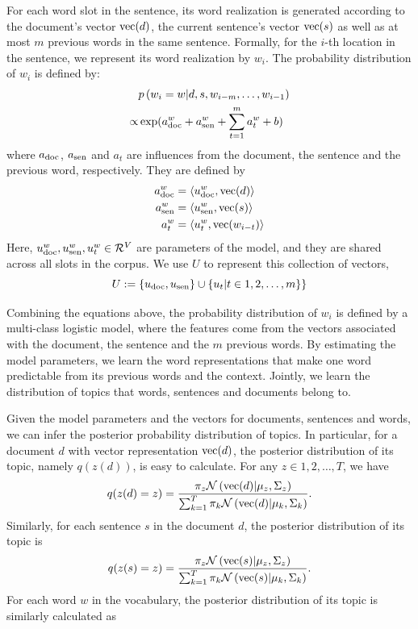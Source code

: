 \documentclass[english,letter]{article}
\renewcommand\[{\begin{equation}}
\renewcommand\]{\end{equation}}
\begin{document}
For each word slot in the sentence, its word realization is generated
according to the document's vector ${\rm vec}(d)$, the current sentence's
vector ${\rm vec}(s)$ as well as at most $m$ previous words in the
same sentence. Formally, for the $i$-th location in the sentence,
we represent its word realization by $w_{i}$. The probability distribution
of $w_{i}$ is defined by:
\begin{align}
 & p\left(w_{i}=w|d,s,w_{i-m},\ldots,w_{i-1}\right)\nonumber \\
\propto & \exp(a_{{\rm doc}}^{w}+a_{{\rm sen}}^{w}+\sum_{t=1}^{m}a_{t}^{w}+b)\label{eq:p(w)}
\end{align}
where $a_{{\rm doc}}$, $a_{{\rm sen}}$ and $a_{t}$ are influences
from the document, the sentence and the previous word, respectively.
They are defined by
\begin{align}
a_{{\rm doc}}^{w} & =\langle u_{{\rm doc}}^{w},{\rm vec}(d)\rangle\label{eq:alpha-1}\\
a_{{\rm sen}}^{w} & =\langle u_{{\rm sen}}^{w},{\rm vec}(s)\rangle\label{eq:alpha-2}\\
a_{t}^{w} & =\langle u_{t}^{w},{\rm vec}(w_{i-t})\rangle\label{eq:alpha-3}
\end{align}
Here, $u_{{\rm doc}}^{w},u_{{\rm sen}}^{w},u_{t}^{w}\in\mathcal{R}^{V}$
are parameters of the model, and they are shared across all slots
in the corpus. We use $U$ to represent this collection of vectors,
\[
U:=\{u_{{\rm doc}},u_{{\rm sen}}\}\cup\left\{ u_{t}|t\in1,2,\ldots,m\}\right\}
\]


Combining the equations above, the probability distribution of $w_{i}$
is defined by a multi-class logistic model, where the features come
from the vectors associated with the document, the sentence and the
$m$ previous words. By estimating the model parameters, we learn
the word representations that make one word predictable from its previous
words and the context. Jointly, we learn the distribution of topics
that words, sentences and documents belong to.

Given the model parameters and the vectors for documents, sentences
and words, we can infer the posterior probability distribution of
topics. In particular, for a document $d$ with vector representation
${\rm vec}(d)$, the posterior distribution of its topic, namely $q(z(d))$,
is easy to calculate. For any $z\in{1,2,\dots,T}$, we have
\[
q(z(d)=z)=\frac{\pi_{z}{\cal N}\left({\rm vec}(d)|\mu_{z},\Sigma_{z}\right)}{\sum_{k=1}^{T}\pi_{k}{\cal N}\left({\rm vec}(d)|\mu_{k},\Sigma_{k}\right)}.
\]
Similarly, for each sentence $s$ in the document $d$, the posterior
distribution of its topic is
\[
q(z(s)=z)=\frac{\pi_{z}{\cal N}\left({\rm vec}(s)|\mu_{z},\Sigma_{z}\right)}{\sum_{k=1}^{T}\pi_{k}{\cal N}\left({\rm vec}(s)|\mu_{k},\Sigma_{k}\right)}.
\]
For each word $w$ in the vocabulary, the posterior distribution of
its topic is similarly calculated as
\end{document}
